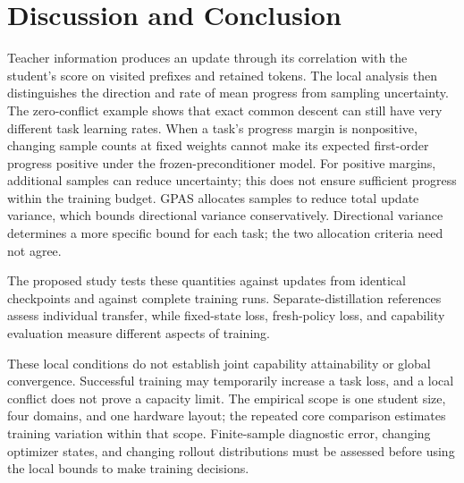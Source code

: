 \section{Discussion and Conclusion}
\label{sec:conclusion}

Teacher information produces an update through its correlation with the
student's score on visited prefixes and retained tokens. The local analysis
then distinguishes the direction and rate of mean progress from sampling
uncertainty. The zero-conflict example shows that exact common descent
can still have very different task learning rates. When a task's progress margin is
nonpositive, changing sample counts at fixed weights cannot make its
expected first-order progress positive under the frozen-preconditioner
model. For positive margins, additional samples can reduce uncertainty;
this does not ensure sufficient progress within the training budget.
GPAS allocates samples to reduce total update variance, which bounds
directional variance conservatively. Directional variance determines a more specific
bound for each task; the two allocation criteria need not agree.

The proposed study tests these quantities against updates from identical
checkpoints and against complete training runs. Separate-distillation
references assess individual transfer, while fixed-state loss, fresh-policy
loss, and capability evaluation measure different aspects of training.

These local conditions do not establish joint capability attainability or
global convergence. Successful training may temporarily increase a task
loss, and a local conflict does not prove a capacity limit. The empirical
scope is one student size, four domains, and one hardware layout; the
repeated core comparison estimates training variation within that scope.
Finite-sample diagnostic error, changing optimizer states, and changing
rollout distributions must be assessed before using the local bounds to
make training decisions.
